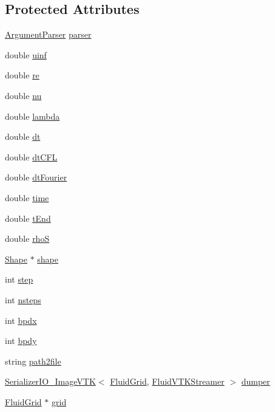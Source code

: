 \subsection*{Protected Attributes}
\begin{DoxyCompactItemize}
\item 
\hyperlink{class_argument_parser}{Argument\+Parser} \hyperlink{class_sim___f_s_i___fixed_aaf006918f66045dbacd9d0392bd99bbd}{parser}
\item 
double \hyperlink{class_sim___f_s_i___fixed_adbebdb69690216b89cf81339ac4a5e0e}{uinf}
\item 
double \hyperlink{class_sim___f_s_i___fixed_a439d225a6a3f4dcba00ace7e66adb049}{re}
\item 
double \hyperlink{class_sim___f_s_i___fixed_a309a6019a5f0d5bb2eed40d2afc362e8}{nu}
\item 
double \hyperlink{class_sim___f_s_i___fixed_a6461a9422d734b3b546b664087717d75}{lambda}
\item 
double \hyperlink{class_sim___f_s_i___fixed_aac96337fe38ebde7c000b48e9cc8a5a9}{dt}
\item 
double \hyperlink{class_sim___f_s_i___fixed_a501b1373276553911410c679fa282b0d}{dt\+C\+F\+L}
\item 
double \hyperlink{class_sim___f_s_i___fixed_a5dea9750a2ba748dc420274b88f31f75}{dt\+Fourier}
\item 
double \hyperlink{class_sim___f_s_i___fixed_a3cfdaa1a00829b2784bcd6fccb3c09d2}{time}
\item 
double \hyperlink{class_sim___f_s_i___fixed_aa70a1ca13502295034e8c74b5d88413e}{t\+End}
\item 
double \hyperlink{class_sim___f_s_i___fixed_a4462b542d7cd03c08d02ab0c999696fd}{rho\+S}
\item 
\hyperlink{class_shape}{Shape} $\ast$ \hyperlink{class_sim___f_s_i___fixed_a060856f474005acc5d5fd49ceef308e3}{shape}
\item 
int \hyperlink{class_sim___f_s_i___fixed_ab006780562c89322d5899acf98ba30fb}{step}
\item 
int \hyperlink{class_sim___f_s_i___fixed_a4a2d60194eb85b0719e3c24ba04201a6}{nsteps}
\item 
int \hyperlink{class_sim___f_s_i___fixed_a719f3cc786db8b65eee89d2d96b5a200}{bpdx}
\item 
int \hyperlink{class_sim___f_s_i___fixed_a5c55ef58ef53121613d54da464771654}{bpdy}
\item 
string \hyperlink{class_sim___f_s_i___fixed_a7383a5ccb77fa4d14158e2b515624f97}{path2file}
\item 
\hyperlink{class_serializer_i_o___image_v_t_k}{Serializer\+I\+O\+\_\+\+Image\+V\+T\+K}$<$ \hyperlink{_definitions_8h_aff3288a3741f5098bcc456bb13440189}{Fluid\+Grid}, \hyperlink{struct_fluid_v_t_k_streamer}{Fluid\+V\+T\+K\+Streamer} $>$ \hyperlink{class_sim___f_s_i___fixed_a7b3628f6a2828c4d4ad58e45b2f703b1}{dumper}
\item 
\hyperlink{_definitions_8h_aff3288a3741f5098bcc456bb13440189}{Fluid\+Grid} $\ast$ \hyperlink{class_sim___f_s_i___fixed_a061514d9968f66df0d1e1bb040fe019c}{grid}
\end{DoxyCompactItemize}


